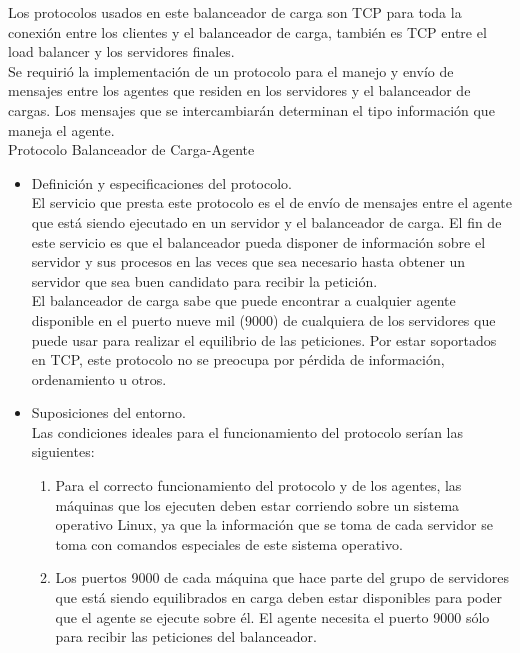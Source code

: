 Los protocolos usados en este balanceador de carga son TCP para toda la conexión entre los clientes y el balanceador de carga, también es TCP entre
el load balancer y los servidores finales.\\
Se requirió la implementación de un protocolo para el manejo y envío de mensajes entre los agentes que residen en los servidores y el balanceador
 de cargas. Los mensajes que se intercambiarán determinan el tipo información que maneja el agente.\\
 
 Protocolo Balanceador de Carga-Agente
 
 \begin{itemize}
 \item Definición y especificaciones del protocolo.\\
El servicio que presta este protocolo es el de envío de mensajes entre el agente que está siendo ejecutado en un servidor y el balanceador de carga.
El fin de este servicio es que el balanceador pueda disponer de información sobre el servidor y sus procesos en las veces que sea necesario hasta
obtener un servidor que sea buen candidato para recibir la petición.\\
El balanceador de carga sabe que puede encontrar a cualquier agente disponible en el puerto nueve mil (9000) de cualquiera de los servidores
que puede usar para realizar el equilibrio de las peticiones.
Por estar soportados en TCP, este protocolo no se preocupa por pérdida de información, ordenamiento u otros.
  \item Suposiciones del entorno.\\
  Las condiciones ideales para el funcionamiento del protocolo serían las siguientes:
  \begin{enumerate}

\item Para el correcto funcionamiento del protocolo y de los agentes, las máquinas que los ejecuten deben estar corriendo sobre un sistema operativo
Linux, ya que la información que se toma de cada servidor se toma con comandos especiales de este sistema operativo.

\item Los puertos 9000 de cada máquina que hace parte del grupo de servidores que está siendo equilibrados en carga deben estar disponibles
para poder que el agente se ejecute sobre él. El agente necesita el puerto 9000 sólo para recibir las peticiones del balanceador.


\end{enumerate}
\end{itemize}
